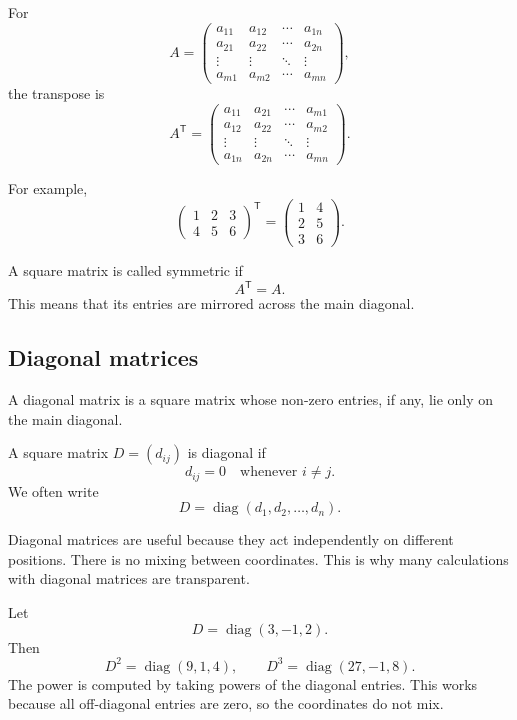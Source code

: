\begin{definitionbox}
For
\[
A=
\begin{pmatrix}
a_{11}&a_{12}&\cdots&a_{1n}\\
a_{21}&a_{22}&\cdots&a_{2n}\\
\vdots&\vdots&\ddots&\vdots\\
a_{m1}&a_{m2}&\cdots&a_{mn}
\end{pmatrix},
\]
the transpose is
\[
A^{\mathsf T}=
\begin{pmatrix}
a_{11}&a_{21}&\cdots&a_{m1}\\
a_{12}&a_{22}&\cdots&a_{m2}\\
\vdots&\vdots&\ddots&\vdots\\
a_{1n}&a_{2n}&\cdots&a_{mn}
\end{pmatrix}.
\]
\end{definitionbox}

For example,
\[
\begin{pmatrix}
1&2&3\\
4&5&6
\end{pmatrix}^{\mathsf T}
=
\begin{pmatrix}
1&4\\
2&5\\
3&6
\end{pmatrix}.
\]

A square matrix is called symmetric if
\[
A^{\mathsf T}=A.
\]
This means that its entries are mirrored across the main diagonal.

\subsection*{Diagonal matrices}

A diagonal matrix is a square matrix whose non-zero entries, if any, lie only on the main diagonal.

\begin{definitionbox}
A square matrix \(D=(d_{ij})\) is diagonal if
\[
d_{ij}=0
\quad \text{whenever } i\ne j.
\]
We often write
\[
D=\operatorname{diag}(d_1,d_2,\ldots,d_n).
\]
\end{definitionbox}

Diagonal matrices are useful because they act independently on different positions. There is no mixing between coordinates. This is why many calculations with diagonal matrices are transparent.

\begin{examplebox}
Let
\[
D=\operatorname{diag}(3,-1,2).
\]
Then
\[
D^2=\operatorname{diag}(9,1,4),
\qquad
D^3=\operatorname{diag}(27,-1,8).
\]
The power is computed by taking powers of the diagonal entries. This works because all off-diagonal entries are zero, so the coordinates do not mix.
\end{examplebox}

